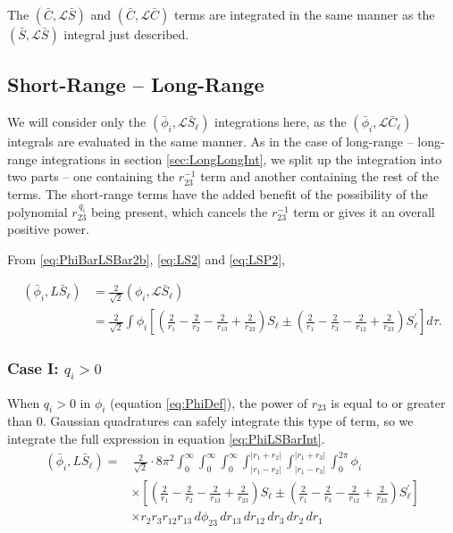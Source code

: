 \documentclass[Dissertation.tex]{subfiles}
\begin{document}
The $(\bar{C},\mathcal{L} \bar{S})$ and $(\bar{C},\mathcal{L} \bar{C})$ terms are integrated in the same manner as the $(\bar{S},\mathcal{L} \bar{S})$ integral just described.


\subsection{Short-Range -- Long-Range}
\label{sec:ShortLongInt}
We will consider only the $(\bar{\phi}_i,\mathcal{L} \bar{S}_\ell)$ integrations here, as the $(\bar{\phi}_i,\mathcal{L} \bar{C}_\ell)$ integrals are evaluated in the same manner. As in the case of long-range -- long-range integrations in section \ref{sec:LongLongInt}, we split up the integration into two parts -- one containing the $r_{23}^{-1}$ term and another containing the rest of the terms. The short-range terms have the added benefit of the possibility of the polynomial $r_{23}^{\,q_i}$ being present, which cancels the $r_{23}^{-1}$ term or gives it an overall positive power.


From \ref{eq:PhiBarLSBar2b}, \ref{eq:LS2} and \ref{eq:LSP2}, 

\begin{align}
\label{eq:PhiLSBarInt}
\nonumber (\bar{\phi}_i, L\bar{S}_\ell) &= \frac{2}{\sqrt{2}} \left(\phi_i,\mathcal{L} \bar{S}_\ell\right) \\
 &= \frac{2}{\sqrt{2}} \int \phi_i \left[ \left( \frac{2}{r_1} - \frac{2}{r_2} - \frac{2}{r_{13}} + \frac{2}{r_{23}} \right)S_\ell \pm \left( \frac{2}{r_1} - \frac{2}{r_3} - \frac{2}{r_{12}} + \frac{2}{r_{23}} \right) S_\ell^\prime \right]  d\tau.
\end{align}

\subsubsection{Case I: \texorpdfstring{$q_i > 0$}{qi > 0}}
\label{sec:Swaveqigt0}
When $q_i > 0$ in $\phi_i$ (equation \ref{eq:PhiDef}), the power of $r_{23}$ is equal to or greater than 0.  Gaussian quadratures can safely integrate this type of term, so we integrate the full expression in equation \ref{eq:PhiLSBarInt}.
\begin{align}
\label{eq:PhiLSBarIntFull}
\nonumber (\bar{\phi}_i, L\bar{S}_\ell) =& \, \frac{2}{\sqrt{2}} \cdot 8\pi^2  \int_0^\infty \int_0^\infty \int_0^\infty \int_{|r_1 - r_2|}^{|r_1 + r_2|} \int_{|r_1 - r_3|}^{|r_1 + r_3|} \int_0^{2\pi} \phi_i \\
&\times \left[ \left( \frac{2}{r_1} - \frac{2}{r_2} - \frac{2}{r_{13}} + \frac{2}{r_{23}} \right)S_\ell \pm \left( \frac{2}{r_1} - \frac{2}{r_3} - \frac{2}{r_{12}} + \frac{2}{r_{23}} \right) S_\ell^\prime \right] \\
&\times r_2 r_3 r_{12} r_{13}\, d\phi_{23}\, dr_{13}\, dr_{12}\, dr_3\, dr_2\, dr_1
\end{align}
\end{document}
